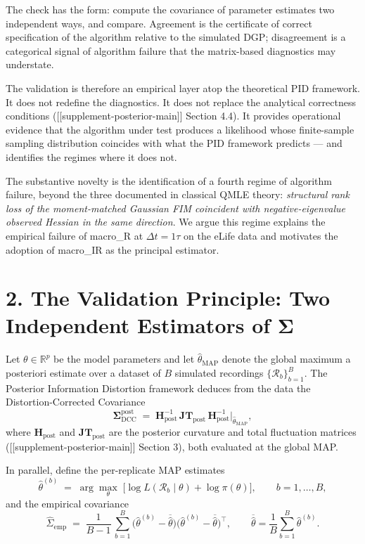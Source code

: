 \documentclass[11pt]{article}
\begin{document}
The check has the form: compute the covariance of parameter estimates
two independent ways, and compare. Agreement is the certificate of
correct specification of the algorithm relative to the simulated DGP;
disagreement is a categorical signal of algorithm failure that the
matrix-based diagnostics may understate.

The validation is therefore an empirical layer atop the theoretical
PID framework. It does not redefine the diagnostics. It does not
replace the analytical correctness conditions
([[supplement-posterior-main]] Section 4.4). It provides operational
evidence that the algorithm under test produces a likelihood whose
finite-sample sampling distribution coincides with what the PID
framework predicts --- and identifies the regimes where it does not.

The substantive novelty is the identification of a fourth regime of
algorithm failure, beyond the three documented in classical QMLE
theory: \emph{structural rank loss of the moment-matched Gaussian FIM
coincident with negative-eigenvalue observed Hessian in the same
direction}. We argue this regime explains the empirical failure of
macro\_R at $\Delta t = 1\tau$ on the eLife data and motivates the
adoption of macro\_IR as the principal estimator.

\section*{2. The Validation Principle: Two Independent Estimators of $\boldsymbol\Sigma$}
\label{sec:av-validation-principle}

Let $\theta \in \mathbb R^p$ be the model parameters and let $\widehat\theta_{\mathrm{MAP}}$
denote the global maximum a posteriori estimate over a dataset of $B$
simulated recordings $\{\mathcal R_b\}_{b=1}^B$. The Posterior
Information Distortion framework deduces from the data the
Distortion-Corrected Covariance
\begin{equation}
\boldsymbol\Sigma_{\mathrm{DCC}}^{\mathrm{post}}
\;=\;
\mathbf H_{\mathrm{post}}^{-1}\,
\mathbf{JT}_{\mathrm{post}}\,
\mathbf H_{\mathrm{post}}^{-1}
\big|_{\widehat\theta_{\mathrm{MAP}}},
\label{eq:av-sigma-dcc}
\end{equation}
where $\mathbf H_{\mathrm{post}}$ and $\mathbf{JT}_{\mathrm{post}}$
are the posterior curvature and total fluctuation matrices
([[supplement-posterior-main]] Section 3), both evaluated at the
global MAP.

In parallel, define the per-replicate MAP estimates
\begin{equation}
\widehat\theta^{(b)}
\;=\;
\arg\max_\theta\;\bigl[\log L(\mathcal R_b\mid\theta) + \log\pi(\theta)\bigr],
\qquad b = 1,\ldots,B,
\label{eq:av-per-rep-MAP}
\end{equation}
and the empirical covariance
\begin{equation}
\widehat\Sigma_{\mathrm{emp}}
\;=\;
\frac{1}{B-1}\,\sum_{b=1}^B
\bigl(\widehat\theta^{(b)} - \overline{\widehat\theta}\bigr)
\bigl(\widehat\theta^{(b)} - \overline{\widehat\theta}\bigr)^\top,
\qquad
\overline{\widehat\theta} = \frac{1}{B}\sum_{b=1}^B\widehat\theta^{(b)}.
\label{eq:av-sigma-emp}
\end{equation}
\end{document}
